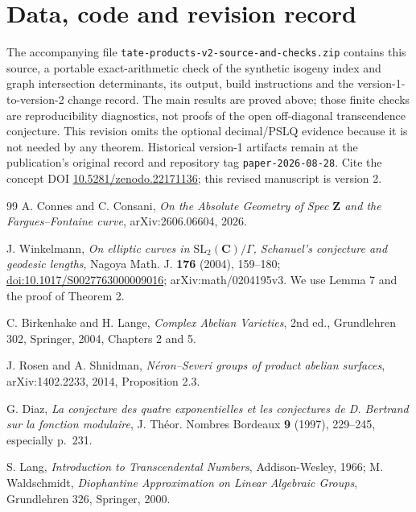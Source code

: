 \documentclass[11pt]{article}
\theoremstyle{definition}
\theoremstyle{remark}
\newcommand{\Z}{\mathbf{Z}}
\newcommand{\C}{\mathbf{C}}
\begin{document}
\section*{Data, code and revision record}
The accompanying file \texttt{tate-products-v2-}\allowbreak\texttt{source-and-checks.zip}
contains this source, a portable exact-arithmetic check of the synthetic
isogeny index and graph intersection determinants, its output, build
instructions and the version-1-to-version-2 change record. The main results
are proved above; those finite checks are reproducibility diagnostics, not
proofs of the open off-diagonal transcendence conjecture. This revision omits
the optional decimal/PSLQ evidence because it is not needed by any theorem.
Historical version-1 artifacts remain at the publication's original record
and repository tag \texttt{paper-2026-08-28}. Cite the concept DOI
\href{https://doi.org/10.5281/zenodo.22171136}{10.5281/zenodo.22171136};
this revised manuscript is version 2.

\begin{thebibliography}{99}
 A. Connes and C. Consani, \emph{On the Absolute Geometry
of Spec $\Z$ and the Fargues--Fontaine curve}, arXiv:2606.06604, 2026.

 J. Winkelmann, \emph{On elliptic curves in
$\mathrm{SL}_2(\C)/\Gamma$, Schanuel's conjecture and geodesic lengths},
Nagoya Math. J. \textbf{176} (2004), 159--180;
\href{https://doi.org/10.1017/S0027763000009016}{doi:10.1017/S0027763000009016};
arXiv:math/0204195v3. We use Lemma 7 and the proof of Theorem 2.

 C. Birkenhake and H. Lange, \emph{Complex Abelian Varieties},
2nd ed., Grundlehren 302, Springer, 2004, Chapters 2 and 5.

 J. Rosen and A. Shnidman, \emph{N\'eron--Severi groups of
product abelian surfaces}, arXiv:1402.2233, 2014, Proposition 2.3.

 G. Diaz, \emph{La conjecture des quatre exponentielles
et les conjectures de D. Bertrand sur la fonction modulaire}, J. Th\'eor.
Nombres Bordeaux \textbf{9} (1997), 229--245, especially p.~231.

 S. Lang, \emph{Introduction to Transcendental Numbers},
Addison-Wesley, 1966; M. Waldschmidt, \emph{Diophantine Approximation on
Linear Algebraic Groups}, Grundlehren 326, Springer, 2000.
\end{thebibliography}
\end{document}
